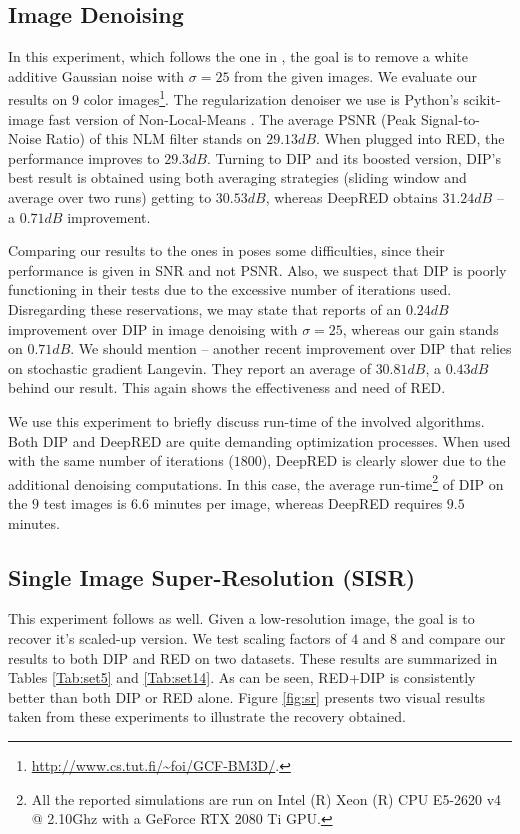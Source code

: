 \documentclass[12pt]{article}
\begin{document}
\subsection{Image Denoising}

In this experiment, which follows the one in \cite{DIP-2018}, the goal is to remove a white additive Gaussian noise with $\sigma=25$ from the given images. We evaluate our results on $9$ color images\footnote{ \url{http://www.cs.tut.fi/~foi/GCF-BM3D/}.}. The regularization denoiser we use is Python's \textsf{scikit-image} fast version of Non-Local-Means \cite{NLM}. The average PSNR (Peak Signal-to-Noise Ratio) of this NLM filter stands on $29.13dB$. When plugged into RED, the performance improves to $29.3dB$. Turning to DIP and its boosted version, DIP's best result is obtained using both averaging strategies (sliding window and average over two runs) getting to $30.53dB$, whereas DeepRED obtains $31.24dB$ -- a $0.71dB$ improvement. 

Comparing our results to the ones in \cite{DIP-TV} poses some difficulties, since their performance is given in SNR and not PSNR.
Also, we suspect that DIP is poorly functioning in their tests due to the excessive number of iterations used. 
Disregarding these reservations, we may state that \cite{DIP-TV} reports of an $0.24dB$ improvement over DIP in image denoising with $\sigma=25$, whereas our gain stands on $0.71dB$. We should mention \cite{cheng2019bayesian} -- another recent improvement over DIP that relies on stochastic gradient Langevin. They report an average of $30.81dB$, a $0.43dB$ behind our result. This again shows the effectiveness and need of RED. 

We use this experiment to briefly discuss run-time of the involved algorithms. Both DIP and DeepRED are quite demanding optimization processes. When used with the same number of iterations ($1800$), DeepRED is clearly slower due to the additional denoising computations. In this case, the average run-time\footnote{All the reported simulations are run on Intel (R) Xeon (R) CPU E5-2620 v4 @ 2.10Ghz with a GeForce RTX 2080 Ti GPU.} of DIP on the $9$ test images is $6.6$ minutes per image, whereas DeepRED requires $9.5$ minutes. 



\subsection{Single Image Super-Resolution (SISR)}

This experiment follows \cite{DIP-2018} as well. Given a low-resolution image, the goal is to recover it's scaled-up version. We test scaling factors of $4$ and $8$ and compare our results to both DIP \cite{DIP-2018} and RED \cite{RED-2017} on two datasets. These results are summarized in Tables \ref{Tab:set5} and \ref{Tab:set14}. As can be seen, RED+DIP is consistently better than both DIP or RED alone. Figure \ref{fig:sr} presents two visual results taken from these experiments to illustrate the recovery obtained. 
\end{document}
